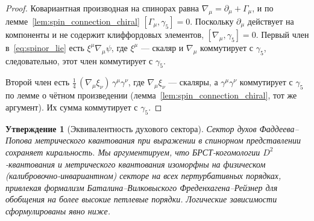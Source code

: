 \documentclass[12pt,a4paper]{article}
\newtheorem{proposition}[theorem]{Утверждение}
\theoremstyle{definition}
\theoremstyle{remark}
\begin{document}
\begin{proof}
Ковариантная производная на спинорах равна
$\nabla_\mu = \partial_\mu + \Gamma_\mu$, и по
лемме~\ref{lem:spin_connection_chiral} $[\Gamma_\mu, \gamma_5] = 0$.
Поскольку $\partial_\mu$ действует на компоненты и не содержит
клиффордовых элементов, $[\nabla_\mu, \gamma_5] = 0$.  Первый
член в~\eqref{eq:spinor_lie} есть $\xi^\mu\nabla_\mu\psi$, где
$\xi^\mu$ --- скаляр и $\nabla_\mu$ коммутирует с $\gamma_5$,
следовательно, этот член коммутирует с $\gamma_5$.

Второй член есть
$\tfrac{1}{4}\,(\nabla_\mu\xi_\nu)\,\gamma^\mu\gamma^\nu$, где
$\nabla_\mu\xi_\nu$ --- скаляры, а $\gamma^\mu\gamma^\nu$ коммутирует
с $\gamma_5$ по лемме о чётном произведении
(лемма~\ref{lem:spin_connection_chiral}, тот же аргумент).  Их сумма
коммутирует с $\gamma_5$.
\end{proof}

\begin{proposition}[Эквивалентность духового сектора]
\label{thm:ghost_equivalence}
Сектор духов Фаддеева--Попова метрического квантования при выражении в
спинорном представлении сохраняет киральность.  Мы аргументируем, что
БРСТ-когомологии $D^2$-квантования и метрического квантования
изоморфны на физическом (калибровочно-инвариантном) секторе на всех
пертурбативных порядках, привлекая формализм Баталина--Вилковыского
Фреденхагена--Рейзнер для обобщения на более высокие петлевые порядки.
Логические зависимости сформулированы явно ниже.
\end{proposition}
\end{document}
